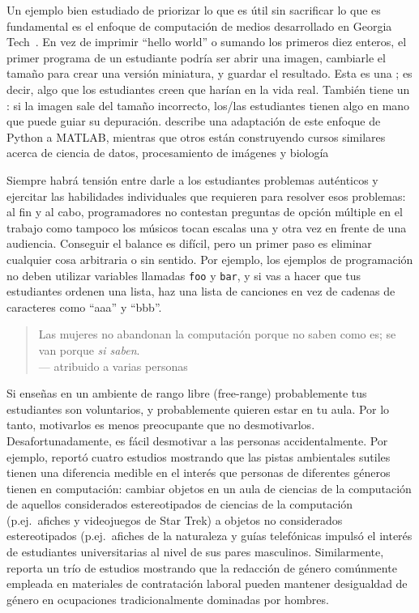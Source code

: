 Un ejemplo bien estudiado de priorizar lo que es útil
sin sacrificar lo que es fundamental
es el enfoque de computación de medios desarrollado en Georgia Tech~\cite{Guzd2013}.
En vez de imprimir ``hello world'' o sumando los primeros diez enteros,
el primer programa de un estudiante podría ser abrir una imagen,
cambiarle el tamaño para crear una versión miniatura,
y guardar el resultado.
Esta es una ; 
es decir, algo que los estudiantes creen que harían en la vida real.
También tiene un :
si la imagen sale del tamaño incorrecto,
los/las estudiantes tienen algo en mano que puede guiar su depuración.
\cite{Lee2013} describe una adaptación de este enfoque de Python a MATLAB,
mientras que otros están construyendo cursos similares acerca de ciencia de datos, procesamiento de imágenes
y biología~\cite{Dahl2018,Meys2018,Ritz2018}

Siempre habrá tensión entre darle a los estudiantes problemas auténticos
y ejercitar las habilidades individuales que requieren para resolver esos problemas:
al fin y al cabo,
programadores no contestan preguntas de opción múltiple en el trabajo
como tampoco los músicos tocan escalas una y otra vez en frente de una audiencia.
Conseguir el balance es difícil,
pero un primer paso es eliminar cualquier cosa arbitraria o sin sentido.
Por ejemplo,
los ejemplos de programación no deben utilizar variables llamadas \texttt{foo} y \texttt{bar},
y si vas a hacer que tus estudiantes ordenen una lista,
haz una lista de canciones en vez de cadenas de caracteres como ``aaa'' y ``bbb''.


\begin{quote}

  Las mujeres no abandonan la computación porque no saben como es;
  se van porque \emph{si saben}. \\
  --- atribuido a varias personas

\end{quote}

Si enseñas en un ambiente de rango libre (free-range)
probablemente tus estudiantes son voluntarios,
y probablemente quieren estar en tu aula.
Por lo tanto, motivarlos es menos preocupante que no desmotivarlos.
Desafortunadamente,
es fácil desmotivar a las personas accidentalmente.
Por ejemplo,
\cite{Cher2009} reportó cuatro estudios mostrando que
las pistas ambientales sutiles tienen una diferencia medible en el interés que personas de diferentes géneros tienen en computación:
cambiar objetos en un aula de ciencias de la computación de aquellos considerados estereotipados de ciencias de la computación
(p.ej.\ afiches y videojuegos de Star Trek)
a objetos no considerados estereotipados (p.ej.\ afiches de la naturaleza y guías telefónicas
impulsó el interés de estudiantes universitarias al nivel de sus pares masculinos.
Similarmente,
\cite{Gauc2011} reporta un trío de estudios mostrando que
la redacción de género comúnmente empleada en materiales de contratación laboral 
pueden mantener desigualdad de género en ocupaciones tradicionalmente dominadas por hombres.

